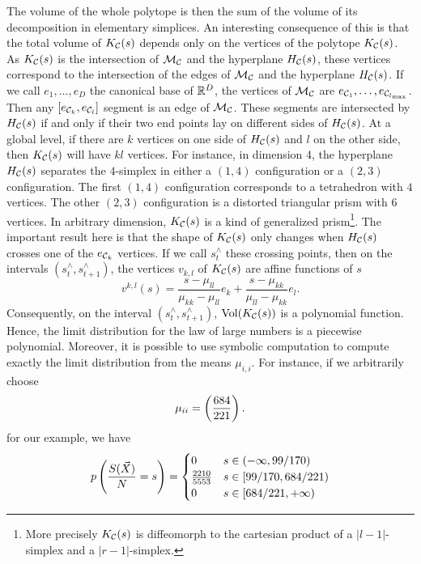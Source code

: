 \documentclass{article}
\begin{document}
The volume of the whole polytope is then the sum of the volume of its decomposition in elementary simplices.
An interesting consequence of this is that the total volume of $K_\mathcal C (s)$ depends only on the vertices of the polytope 
$K_\mathcal C (s)$. As $K_\mathcal C (s)$ is the intersection of $\mathcal M_{\mathcal C }$ and the hyperplane $H_\mathcal C (s)$, these vertices correspond 
to the intersection of the edges of $\mathcal M_{\mathcal C }$ and the hyperplane $H_\mathcal C (s)$. If we call $e_1,\dots,e_{D}$ the canonical
base of $\mathbb R^D$, the vertices of $\mathcal M_{\mathcal C }$ are $e_{\mathcal C _1},\dots, e_{\mathcal C _{{l_{\max}}}}$. Then any $[e_{\mathcal C _k}, e_{\mathcal C _l}]$ segment is an edge of $\mathcal M_{\mathcal C }$.
These segments are intersected by $H_\mathcal C (s)$ if and only if their two end points lay on different sides of $H_\mathcal C (s)$.
At a global level, if there are $k$ vertices on one side of $H_\mathcal C (s)$ and $l$ on the other side, then $K_\mathcal C (s)$ will
have $kl$ vertices. For instance, in dimension 4, the hyperplane $H_\mathcal C (s)$ separates the $4$-simplex in either a $(1,4)$ 
configuration or a $(2,3)$ configuration. The first $(1,4)$ configuration corresponds to a tetrahedron with $4$ vertices.
The other $(2,3)$ configuration is a distorted triangular prism with $6$ vertices. In arbitrary dimension,
$K_\mathcal C (s)$ is a kind of generalized prism\footnote{More precisely $K_\mathcal C (s)$ is diffeomorph 
to the cartesian product of a $|l-1|$-simplex and a $|r-1|$-simplex.}. 
The important result here is that the shape of $K_\mathcal C (s)$ only changes when $H_\mathcal C (s)$ crosses one of the $e_{\mathcal C _k}$ vertices.
If we call $s^{\wedge}_t$ these crossing points, then on the intervals $(s^{\wedge}_t,s^{\wedge}_{t+1})$, the vertices $v_{k,l}$ of
$K_\mathcal C (s)$ are affine functions of $s$ 
\begin{equation}
v^{k,l}(s) =  \frac{ s -  \mu _{ll} }{ \mu_{kk} - \mu _{ll} }  e_k + \frac{ s - \mu _{kk} }{ \mu _{ll} - \mu _{kk} }  e_l. 
\end{equation} 
Consequently, on the interval $(s^{\wedge}_t,s^{\wedge}_{t+1})$, $\mathrm{Vol}(K_\mathcal C (s))$ is a polynomial function.
Hence, the limit distribution for the law of large numbers is a piecewise polynomial.
Moreover, it is possible to use symbolic computation to compute exactly the limit distribution from the means $\mu_{i,i}$. For instance, if we arbitrarily choose 
\begin{equation}
\mu_{ii} = \left(\frac{684}{221}\right).
\end{equation}
for our example, we have
%
\begin{equation}
 p \left( \frac{S(\vec{X})}{N} = s \right) = \begin{cases}
 0 & s \in (-\infty,99/170)\\
\frac{2210}{5553} & s \in [99/170,684/221)\\
 0 & s \in [684/221, +\infty )
 \end{cases} 
\end{equation}
%
\end{document}
